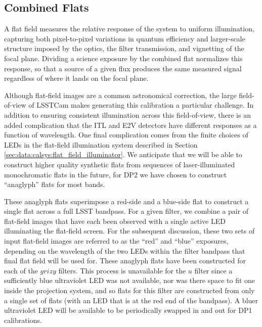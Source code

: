 \subsection{Combined Flats} \label{sec:processing:calibration:flats}

A flat field measures the relative response of the system to uniform illumination, capturing both pixel-to-pixel variations in quantum efficiency and larger-scale structure imposed by the optics, the filter transmission, and vignetting of the focal plane.
Dividing a science exposure by the combined flat normalizes this response, so that a source of a given flux produces the same measured signal regardless of where it lands on the focal plane.

Although flat-field images are a common astronomical correction, the large field-of-view of LSSTCam makes generating this calibration a particular challenge.
In addition to ensuring consistent illumination across this field-of-view, there is an added complication that the ITL and E2V detectors have different responses as a function of wavelength.
One final complication comes from the finite choices of LEDs in the flat-field illumination system described in Section \ref{sec:data:calsys:flat_field_illuminator}.
We anticipate that we will be able to construct higher quality synthetic flats from sequences of laser-illuminated monochromatic flats in the future, for DP2 we have chosen to construct ``anaglyph'' flats for most bands. 

These anaglyph flats superimpose a red-side and a blue-side flat to construct a single flat across a full LSST bandpass. For a given filter, we combine a pair of flat-field images that have each been observed with a single active LED illuminating the flat-field screen.
For the subsequent discussion, these two sets of input flat-field images are referred to as the ``red'' and ``blue'' exposures, depending on the wavelength of the two LEDs within the filter bandpass that final flat field will be used for.
These anaglyph flats have been constructed for each of the $grizy$ filters.
This process is unavailable for the $u$ filter since a sufficiently blue ultraviolet LED was not available, nor was there space to fit one inside the projection system, and so flats for this filter are constructed from only a single set of flats (with an LED that is at the red end of the bandpass).
A bluer ultraviolet LED will be available to be periodically swapped in and out for DP1 calibrations.

